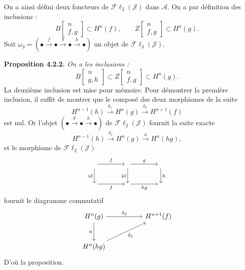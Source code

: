 \clearpage
{}%
\begingroup\small\setlength{\parskip}{0pt}\setlength{\emergencystretch}{1.5em}
On a ainsi défini deux foncteurs de $\mathcal{F}\ell_2(\mathcal J)$ dans
$\mathcal A$. On a par définition des inclusions :
\[
B\!\left[\begin{smallmatrix}n\\f,g\end{smallmatrix}\right]\subset H^n(f),
\qquad
Z\!\left[\begin{smallmatrix}n\\f,g\end{smallmatrix}\right]\subset H^n(g).
\]
Soit
$\omega_3=(\mathord\bullet\xrightarrow f\mathord\bullet\xrightarrow g
\mathord\bullet\xrightarrow h\mathord\bullet)$ un objet de
$\mathcal{F}\ell_3(\mathcal J)$.

\medskip\noindent\textbf{Proposition 4.2.2.}\quad
\textit{On a les inclusions :}
\[
B\!\left[\begin{smallmatrix}n\\g,h\end{smallmatrix}\right]
\subset
Z\!\left[\begin{smallmatrix}n\\f,g\end{smallmatrix}\right]
\subset H^n(g).
\]
La deuxième inclusion est mise pour mémoire. Pour démontrer la première
inclusion, il suffit de montrer que le composé des deux morphismes de la
suite
\[
H^{n-1}(h)\xrightarrow{\delta_1}H^n(g)
\xrightarrow{\delta_2}H^{n+1}(f)
\]
est nul. Or l'objet
$(\mathord\bullet\xrightarrow g\mathord\bullet\xrightarrow h\mathord\bullet)$
de $\mathcal{F}\ell_2(\mathcal J)$ fournit la suite exacte
\[
H^{n-1}(h)\xrightarrow{\delta_1}H^n(g)
\xrightarrow u H^n(hg),
\]
et le morphisme de $\mathcal{F}\ell_2(\mathcal J)$
\[
\begin{tikzcd}[column sep=4em,row sep=2.2em]
{}\arrow[r,"f"]\arrow[d,"\operatorname{id}"']&{}
 \arrow[r,"g"]\arrow[d,"\operatorname{id}"']&{}\arrow[d,"h"]\\
{}\arrow[r,"f"']&{}\arrow[r,"hg"']&{}
\end{tikzcd}
\]
fournit le diagramme commutatif
\[
\begin{tikzcd}[column sep=5em,row sep=2.7em]
H^n(g)\arrow[r,"\delta_2"]\arrow[d,"u"']&H^{n+1}(f)\\
H^n(hg)\arrow[ur,"\delta_3"']&{}
\end{tikzcd}
\]
D'où la proposition.
\endgroup
